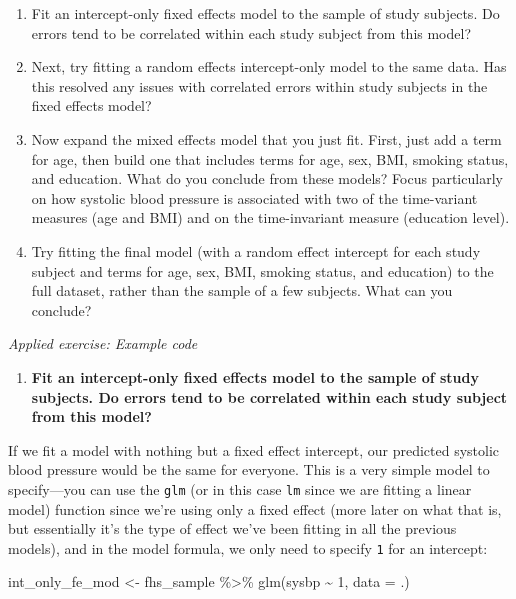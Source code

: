 \documentclass[
]{book}
\newenvironment{Shaded}{\begin{snugshade}}{\end{snugshade}}
\newcommand{\AttributeTok}[1]{\textcolor[rgb]{0.77,0.63,0.00}{#1}}
\newcommand{\DecValTok}[1]{\textcolor[rgb]{0.00,0.00,0.81}{#1}}
\newcommand{\FunctionTok}[1]{\textcolor[rgb]{0.00,0.00,0.00}{#1}}
\newcommand{\NormalTok}[1]{#1}
\newcommand{\OtherTok}[1]{\textcolor[rgb]{0.56,0.35,0.01}{#1}}
\newcommand{\SpecialCharTok}[1]{\textcolor[rgb]{0.00,0.00,0.00}{#1}}
\providecommand{\tightlist}{%
  \setlength{\itemsep}{0pt}\setlength{\parskip}{0pt}}
\begin{document}
\begin{enumerate}
\def\labelenumi{\arabic{enumi}.}
\tightlist
\item
  Fit an intercept-only fixed effects model to the sample of study subjects. Do errors tend to be correlated within each study subject from this model?
\item
  Next, try fitting a random effects intercept-only model to the same data. Has this resolved any issues with correlated errors within study subjects in the fixed effects model?
\item
  Now expand the mixed effects model that you just fit. First, just add a term for
  age, then build one that includes terms for age, sex, BMI, smoking status, and
  education. What do you conclude from these models? Focus particularly on how
  systolic blood pressure is associated with two of the time-variant measures
  (age and BMI) and on the time-invariant measure (education level).
\item
  Try fitting the final model (with a random effect intercept for each study
  subject and terms for age, sex, BMI, smoking status, and education) to the
  full dataset, rather than the sample of a few subjects. What can you conclude?
\end{enumerate}

\emph{Applied exercise: Example code}

\begin{enumerate}
\def\labelenumi{\arabic{enumi}.}
\tightlist
\item
  \textbf{Fit an intercept-only fixed effects model to the sample of study subjects. Do errors tend to be correlated within each study subject from this model?}
\end{enumerate}

If we fit a model with nothing but a fixed effect intercept, our predicted systolic
blood pressure would be the same for everyone. This is a very simple model to
specify---you can use the \texttt{glm} (or in this case \texttt{lm} since we are fitting a linear
model) function since we're using only a fixed effect (more later on what that is,
but essentially it's the type of effect we've been fitting in all the previous models),
and in the model formula, we only need to specify \texttt{1} for an intercept:

\begin{Shaded}
\begin{Highlighting}[]
\NormalTok{int\_only\_fe\_mod }\OtherTok{\textless{}{-}}\NormalTok{ fhs\_sample }\SpecialCharTok{\%\textgreater{}\%} 
  \FunctionTok{glm}\NormalTok{(sysbp }\SpecialCharTok{\textasciitilde{}} \DecValTok{1}\NormalTok{, }\AttributeTok{data =}\NormalTok{ .) }
\end{Highlighting}
\end{Shaded}
\end{document}
